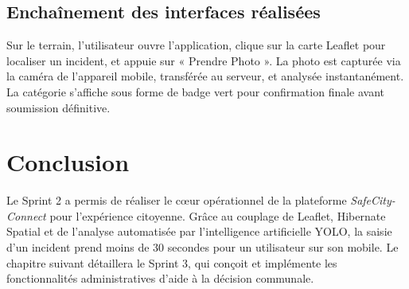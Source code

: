 \subsection{Enchaînement des interfaces réalisées}
Sur le terrain, l'utilisateur ouvre l'application, clique sur la carte Leaflet pour localiser un incident, et appuie sur « Prendre Photo ». La photo est capturée via la caméra de l'appareil mobile, transférée au serveur, et analysée instantanément. La catégorie s'affiche sous forme de badge vert pour confirmation finale avant soumission définitive.

\section*{Conclusion}
Le Sprint 2 a permis de réaliser le cœur opérationnel de la plateforme \textit{SafeCity-Connect} pour l'expérience citoyenne. Grâce au couplage de Leaflet, Hibernate Spatial et de l'analyse automatisée par l'intelligence artificielle YOLO, la saisie d'un incident prend moins de 30 secondes pour un utilisateur sur son mobile. Le chapitre suivant détaillera le Sprint 3, qui conçoit et implémente les fonctionnalités administratives d'aide à la décision communale.
